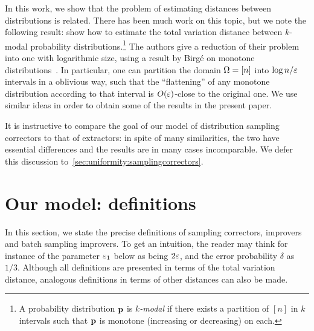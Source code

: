 In this work, we show that the problem of estimating distances
between distributions is related. There has been much work on this
topic, but we note the following result:
\cite{DDSVV:13} show how to estimate the total 
variation distance between $k$-modal probability distributions.\footnote{A probability distribution $\mathbf{p}$ is \emph{$k$-modal} if there exists a partition of $[n]$ in $k$ intervals such that $\mathbf{p}$ is monotone (increasing or decreasing) on each.}
The authors give a reduction of their problem into one with logarithmic size, 
using a result by Birg\'e on monotone distributions~\cite{Birge:87}. In particular, 
one can partition the domain ${\Omega}=[n]$ into $\log n/\varepsilon$ intervals in a oblivious way, 
such that the ``flattening'' of any monotone distribution according 
to that interval is $\bigO{\eps}$-close to the original one. 
We use similar ideas in order to obtain some of the results in the present paper. 

    


It is instructive to compare the goal of our model of distribution sampling correctors to that of extractors: in spite of many similarities, the two have essential differences and the results are in many cases incomparable. We defer this discussion to~\cref{sec:uniformity:samplingcorrectors}.

\section{Our model: definitions}\label{sec:definitions}
	In this section, we state the precise definitions of sampling correctors, improvers and batch sampling improvers. 
To get an intuition, 
the reader may think for instance of the parameter $\varepsilon_1$ below as being $2\varepsilon$, 
and the error probability $\delta$ as $1/3$.
Although all definitions are presented in terms of the total variation
distance, analogous definitions in terms of other distances can also be made.

